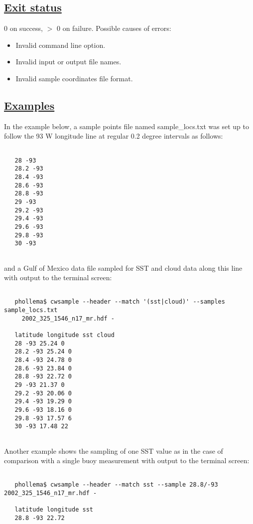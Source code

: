 \subsection*{\underline{Exit status}}


  0 on success, $>$ 0 on failure. Possible causes of errors:
\begin{itemize}
\item  Invalid command line option. 
\item  Invalid input or output file names. 
\item  Invalid sample coordinates file format. 

\end{itemize}
\subsection*{\underline{Examples}}


  In the example below, a sample points file named sample\_locs.txt was set up to follow the 93 W longitude line at regular 0.2 degree intervals as follows:
\begin{verbatim}

   28 -93
   28.2 -93
   28.4 -93
   28.6 -93
   28.8 -93
   29 -93
   29.2 -93
   29.4 -93
   29.6 -93
   29.8 -93
   30 -93
 
\end{verbatim}


 and a Gulf of Mexico data file sampled for SST and cloud data along this line with output to the terminal screen:
\begin{verbatim}

   phollema$ cwsample --header --match '(sst|cloud)' --samples sample_locs.txt
     2002_325_1546_n17_mr.hdf -

   latitude longitude sst cloud
   28 -93 25.24 0
   28.2 -93 25.24 0
   28.4 -93 24.78 0
   28.6 -93 23.84 0
   28.8 -93 22.72 0
   29 -93 21.37 0
   29.2 -93 20.06 0
   29.4 -93 19.29 0
   29.6 -93 18.16 0
   29.8 -93 17.57 6
   30 -93 17.48 22
 
\end{verbatim}


 Another example shows the sampling of one SST value as in the case of comparison with a single buoy measurement with output to the terminal screen:
\begin{verbatim}

   phollema$ cwsample --header --match sst --sample 28.8/-93 2002_325_1546_n17_mr.hdf -

   latitude longitude sst
   28.8 -93 22.72
 
\end{verbatim}


